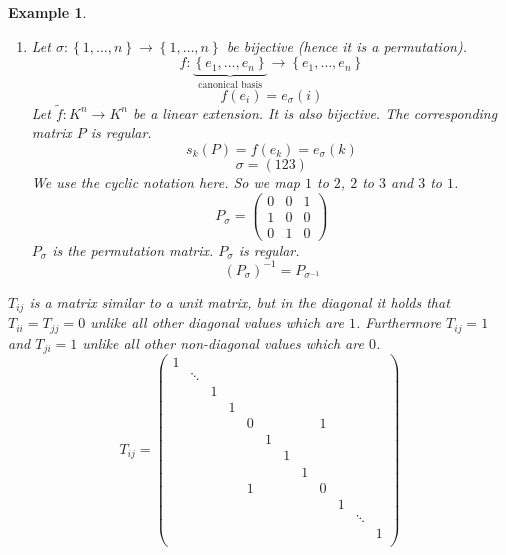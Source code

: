 \documentclass[a4paper,landscape,twocolumn]{article}
\newcommand\set[1]{\left\{#1\right\}}
\newtheorem{ex}{Example}
\begin{document}
\begin{ex}
\begin{enumerate}
\[\begin{bmatrix}
          a_1 & \ldots & 0 \\
          \vdots & \ddots & \vdots \\
          0 & \ldots & a_n
        \end{bmatrix}
        =
        \begin{bmatrix}
          \frac1{a_1} & \ldots & 0 \\
          \vdots & \ddots & \vdots \\
          0 & \ldots & \frac1{a_n}
        \end{bmatrix}
      \]
    \item Let $\sigma: \set{1, \ldots, n} \to \set{1, \ldots, n}$ be bijective
      (hence it is a permutation).
      \[ f: \underbrace{\set{e_1, \ldots, e_n}}_{\text{canonical basis}} \to \set{e_1, \ldots, e_n} \]
      \[ f(e_i) = e_\sigma(i) \]
      Let $\tilde f: K^n \to K^n$ be a linear extension. It is also bijective.
      The corresponding matrix $P$ is regular.
      \[ s_k(P) = f(e_k) = e_\sigma(k) \]
      \[ \sigma = (1 2 3) \]
      We use the cyclic notation here. So we map $1$ to $2$, $2$ to $3$ and $3$ to $1$.
      \[
        P_\sigma = \begin{pmatrix}
          0 & 0 & 1 \\
          1 & 0 & 0 \\
          0 & 1 & 0
        \end{pmatrix}
      \]
      $P_\sigma$ is the \emph{permutation matrix}. $P_\sigma$ is regular.
      \[ \left(P_\sigma\right)^{-1} = P_{\sigma^{-1}} \]
  \end{enumerate}

  $T_{ij}$ is a matrix similar to a unit matrix, but in the diagonal it holds
  that $T_{ii} = T_{jj} = 0$ unlike all other diagonal values which are $1$.
  Furthermore $T_{ij} = 1$ and $T_{ji} = 1$ unlike all other non-diagonal values
  which are $0$.
  \[
    T_{ij} =
    \begin{pmatrix}
      1 &        &   &   &   &   &   &   &   &   &   & \\
        & \ddots &   &   &   &   &   &   &   &   &   & \\
        &        & 1 &   &   &   &   &   &   &   &   & \\
        &        &   & 1 &   &   &   &   &   &   &   & \\
        &        &   &   & 0 &   &   &   & 1 &   &   & \\
        &        &   &   &   & 1 &   &   &   &   &   & \\
        &        &   &   &   &   & 1 &   &   &   &   & \\
        &        &   &   &   &   &   & 1 &   &   &   & \\
        &        &   &   & 1 &   &   &   & 0 &   &   & \\
        &        &   &   &   &   &   &   &   & 1 &   & \\
        &        &   &   &   &   &   &   &   &   & \ddots & \\
        &        &   &   &   &   &   &   &   &   &   & 1 \\
    \end{pmatrix}
  \]
\end{ex}
\end{document}
